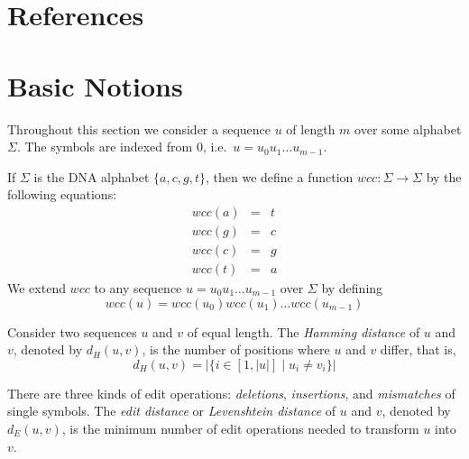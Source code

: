 \documentclass[12pt,titlepage]{article}
\newcommand{\Function}[3]{#1:#2\to#3}
\newcommand{\Size}[1]{|#1|}
\begin{document}
\section{References}
\renewcommand{\refname}{}




\newpage
\appendix

\section{Basic Notions}\label{Basic}
\begin{AboutVmatch}
Throughout this section we consider a sequence \(u\) of length \(m\) 
over some alphabet \(\Sigma\). The symbols are indexed from \(0\), i.e.\ 
\(u=u_{0}u_{1}\ldots u_{m-1}\).

If \(\Sigma\) is the 
DNA alphabet \(\{a,c,g,t\}\), then we define a function 
\(\Function{wcc}{\Sigma}{\Sigma}\) by the following equations:
\begin{eqnarray*}
wcc(a)&=&t\\
wcc(g)&=&c\\
wcc(c)&=&g\\
wcc(t)&=&a
\end{eqnarray*}
We extend \(wcc\) to any sequence \(u=u_{0}u_{1}\ldots u_{m-1}\) over 
\(\Sigma\) by defining \[wcc(u)=wcc(u_{0})wcc(u_{1})\ldots wcc(u_{m-1})\]

Consider two sequences \(u\) and \(v\) of equal length.
The 
\emph{Hamming distance} of $u$ and $v$,
denoted by $d_H(u,v)$, is the number of positions where 
$u$ and $v$ differ, that is,
\[d_H(u,v)=\Size{\{i\in[1,\Size{u}]\mid u_{i}\neq v_{i}\}}\]

There are three kinds of edit operations: \emph{deletions},
\emph{insertions}, and \emph{mismatches} of single symbols.
The 
\emph{edit distance} or \emph{Levenshtein distance} of \(u\) and 
\(v\), denoted by \(d_{E}(u,v)\), is the minimum number of edit operations 
needed to transform \(u\) into \(v\).


\end{AboutVmatch}
\end{document}
